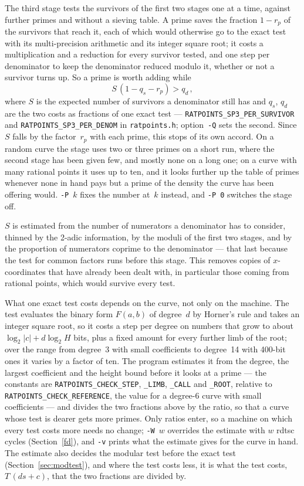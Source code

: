 \documentclass[12pt,a4paper,oneside]{amsart}
\begin{document}
The third stage tests the survivors of the first two stages one at a time, against
further primes and without a sieving table. A prime saves the fraction
$1 - r_p$ of the survivors that reach it, each of which would otherwise go
to the exact test with its multi-precision arithmetic and its integer square
root; it costs a multiplication and a reduction for every survivor tested,
and one step per denominator to keep the denominator reduced modulo it,
whether or not a survivor turns up. So a prime is worth adding while
\[ S\,(1 - q_s - r_p) > q_d \,, \]
where $S$ is the expected number of survivors a denominator still has and
$q_s$, $q_d$ are the two costs as fractions of one exact test ---
\texttt{RATPOINTS\_SP3\_PER\_SURVIVOR} and \texttt{RATPOINTS\_SP3\_PER\_DENOM}
in \texttt{ratpoints.h}; option~\verb+-Q+ sets the second. Since $S$ falls
by the factor~$r_p$ with each prime, this stops of its own accord. On a
random curve the stage uses two or three primes on a short run, where the
second stage has been given few, and mostly none on a long one; on a curve
with many rational points it uses up to ten, and it
looks further up the table of primes whenever none in hand pays but a prime
of the density the curve has been offering would. \verb+-P+~$k$ fixes the
number at~$k$ instead, and \verb+-P 0+ switches the stage off.

$S$ is estimated from the number of numerators a denominator has to
consider, thinned by the 2-adic information, by the moduli of the first two
stages, and by the proportion of numerators coprime to the denominator ---
that last because the test for common factors runs before this stage.
This removes copies of $x$-coordinates that have already been dealt with,
in particular those coming from rational points, which would survive
every test.

What one exact test costs depends on the curve, not only on the machine. The
test evaluates the binary form $F(a,b)$ of degree~$d$ by Horner's rule and
takes an integer square root, so it costs a step per degree on numbers that
grow to about $\log_2|c| + d\log_2 H$ bits, plus a fixed amount for every
further limb of the root; over the range from degree~3 with small
coefficients to degree~14 with 400-bit ones it varies by a factor of ten. The
program estimates it from the degree, the largest coefficient and the height
bound before it looks at a prime --- the constants are
\texttt{RATPOINTS\_CHECK\_STEP}, \texttt{\_LIMB}, \texttt{\_CALL} and
\texttt{\_ROOT}, relative to \texttt{RATPOINTS\_CHECK\_REFERENCE}, the value
for a degree-6 curve with small coefficients --- and divides the two fractions
above by the ratio, so that a curve whose test is dearer gets more primes.
Only ratios enter, so a machine on which every test costs more needs no
change; \verb+-W+~$w$ overrides the estimate with $w$ rdtsc cycles
(Section~\ref{fd}), and \verb+-v+
prints what the estimate gives for the curve in hand. The estimate also
decides the modular test before the exact test
(Section~\ref{sec:modtest}), and where the test costs less, it is what the
test costs, $T\,(d s + c)$, that the two fractions are divided by.
\end{document}
